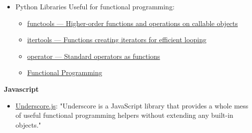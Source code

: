 \documentclass[11pt]{article}
\begin{document}
\begin{itemize}
\item Python Libraries Useful for functional programming:

\begin{itemize}
\item \href{https://docs.python.org/3/library/functools.html}{functools — Higher-order functions and operations on callable objects}

\item \href{https://docs.python.org/3/library/itertools.html}{itertools — Functions creating iterators for efficient looping}

\item \href{https://docs.python.org/3/library/operator.html}{operator — Standard operators as functions}

\item \href{https://www.ics.uci.edu/~pattis/ICS-33/lectures/functionalprogramming.txt}{Functional Programming}
\end{itemize}
\end{itemize}

\textbf{Javascript}

\begin{itemize}
\item \href{http://underscorejs.org/}{Underscore.js}: "Underscore is a JavaScript library that provides a
whole mess of useful functional programming helpers without
extending any built-in objects."
\end{itemize}
\end{document}
